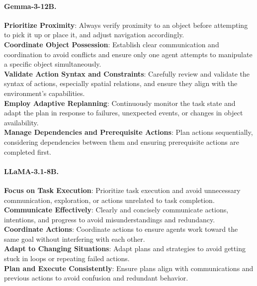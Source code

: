 \documentclass{article}
\theoremstyle{plain}
\theoremstyle{definition}
\theoremstyle{remark}
\begin{document}
\paragraph{Gemma-3-12B.}
\begin{mdframed}[linewidth=0.8pt, roundcorner=4pt, innerleftmargin=6pt, innerrightmargin=6pt]
\textbf{Prioritize Proximity}: Always verify proximity to an object before attempting to pick it up or place it, and adjust navigation accordingly. \\
\textbf{Coordinate Object Possession}: Establish clear communication and coordination to avoid conflicts and ensure only one agent attempts to manipulate a specific object simultaneously. \\
\textbf{Validate Action Syntax and Constraints}: Carefully review and validate the syntax of actions, especially spatial relations, and ensure they align with the environment's capabilities. \\
\textbf{Employ Adaptive Replanning}: Continuously monitor the task state and adapt the plan in response to failures, unexpected events, or changes in object availability. \\
\textbf{Manage Dependencies and Prerequisite Actions}: Plan actions sequentially, considering dependencies between them and ensuring prerequisite actions are completed first.
\end{mdframed}

\paragraph{LLaMA-3.1-8B.}
\begin{mdframed}[linewidth=0.8pt, roundcorner=4pt, innerleftmargin=6pt, innerrightmargin=6pt]
\textbf{Focus on Task Execution}: Prioritize task execution and avoid unnecessary communication, exploration, or actions unrelated to task completion. \\
\textbf{Communicate Effectively}: Clearly and concisely communicate actions, intentions, and progress to avoid misunderstandings and redundancy. \\
\textbf{Coordinate Actions}: Coordinate actions to ensure agents work toward the same goal without interfering with each other. \\
\textbf{Adapt to Changing Situations}: Adapt plans and strategies to avoid getting stuck in loops or repeating failed actions. \\
\textbf{Plan and Execute Consistently}: Ensure plans align with communications and previous actions to avoid confusion and redundant behavior.
\end{mdframed}
\end{document}
